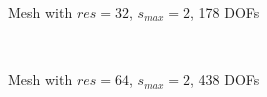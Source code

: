    \begin{figure}[h!]
        \begin{subfigure}[b]{1\linewidth}
            \centering
            \caption{Mesh with $res=32$, $s_{max}=2$, 178 DOFs}
        \end{subfigure}
        \\
        \begin{subfigure}[b]{1\linewidth}
            \centering
            \caption{Mesh with $res=64$, $s_{max}=2$, 438 DOFs}
        \end{subfigure}
        \\
        \begin{subfigure}[b]{1\linewidth}
            \centering
\end{subfigure}
\end{figure}
